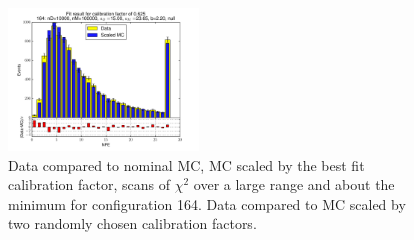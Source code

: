 \begin{figure}[htbp]
\begin{center}
\includegraphics[width=0.45\textwidth]{../FIGURES/164/FIG_Fit_result_for_calibration_factor_of_0_625.pdf} 
\caption{Data compared to nominal MC, MC scaled by the best fit calibration factor, scans of $\chi^2$ over a large range and about the minimum for configuration 164. Data compared to MC scaled by two randomly chosen calibration factors.} 
\label{tab:best_164} 
\end{center} \end{figure} 

